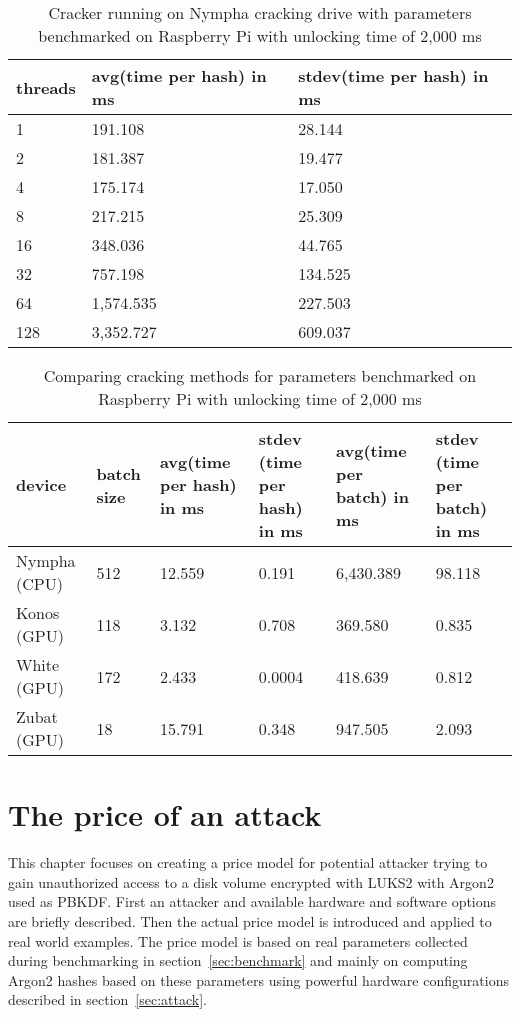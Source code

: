 \documentclass[nolof,digital]{fithesis3}
\begin{document}
\noindent
\begin{table}
\caption{Cracker running on Nympha cracking drive with parameters benchmarked on Raspberry Pi with unlocking time of 2,000 ms}
\label{tab:nymphacrackerrpi}
\begin{tabularx}{\textwidth}{| X | X | X |}
\hline
threads & avg(time per hash) in ms & stdev(time per hash) in ms\\
\hline
1 & 191.108 & 28.144\\
\hline
2 & 181.387 & 19.477\\
\hline
4 & 175.174 & 17.050\\
\hline
8 & 217.215 & 25.309\\
\hline
16 & 348.036 & 44.765\\
\hline
32 & 757.198 & 134.525\\
\hline
64 & 1,574.535 & 227.503\\
\hline
128 & 3,352.727 & 609.037\\
\hline
\end{tabularx}
\end{table}

\noindent
\begin{table}
\caption{Comparing cracking methods for parameters benchmarked on Raspberry Pi with unlocking time of 2,000 ms}
\label{tab:rpicrack}
\begin{tabularx}{\textwidth}{| X | X | X | X | X | X |}
\hline
device & batch size & avg(time per hash) in ms & stdev (time per hash) in ms & avg(time per batch) in ms & stdev (time per batch) in ms\\
\hline
Nympha (CPU) & 512 & 12.559 & 0.191 & 6,430.389 & 98.118\\
\hline
Konos (GPU) & 118 & 3.132 & 0.708 & 369.580 & 0.835\\
\hline
White (GPU) & 172 & 2.433 & 0.0004 & 418.639 & 0.812\\
\hline
Zubat (GPU) & 18 & 15.791 & 0.348 & 947.505 & 2.093\\
\hline
\end{tabularx}
\end{table}

\chapter{The price of an attack}
\label{chap:model}
This chapter focuses on creating a price model for potential attacker trying to gain unauthorized access to a disk volume encrypted with LUKS2 with Argon2 used as PBKDF. First an attacker and available hardware and software options are briefly described. Then the actual price model is introduced and applied to real world examples. The price model is based on real parameters collected during benchmarking in section~\ref{sec:benchmark} and mainly on computing Argon2 hashes based on these parameters using powerful hardware configurations described in section~\ref{sec:attack}.
\end{document}
